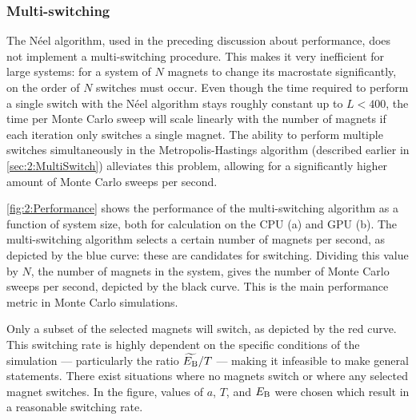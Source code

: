 \subsubsection{Multi-switching}
The N\'eel algorithm, used in the preceding discussion about performance, does not implement a multi-switching procedure.
This makes it very inefficient for large systems: for a system of $N$ magnets to change its macrostate significantly, on the order of $N$ switches must occur.
Even though the time required to perform a single switch with the N\'eel algorithm stays roughly constant up to $L<400$, the time per Monte Carlo sweep will scale linearly with the number of magnets if each iteration only switches a single magnet.
The ability to perform multiple switches simultaneously in the Metropolis-Hastings algorithm (described earlier in \cref{sec:2:MultiSwitch}) alleviates this problem, allowing for a significantly higher amount of Monte Carlo sweeps per second. \\\par
\cref{fig:2:Performance} shows the performance of the multi-switching algorithm as a function of system size, both for calculation on the CPU (a) and GPU (b).
The multi-switching algorithm selects a certain number of magnets per second, as depicted by the blue curve: these are candidates for switching.
Dividing this value by $N$, the number of magnets in the system, gives the number of Monte Carlo sweeps per second, depicted by the black curve.
This is the main performance metric in Monte Carlo simulations. \par
Only a subset of the selected magnets will switch, as depicted by the red curve.
This switching rate is highly dependent on the specific conditions of the simulation --- particularly the ratio $\widetilde{E_\mathrm{B}}/T$ --- making it infeasible to make general statements.
There exist situations where no magnets switch or where any selected magnet switches.
In the figure, values of $a$, $T$, and $E_\mathrm{B}$ were chosen which result in a reasonable switching rate.


